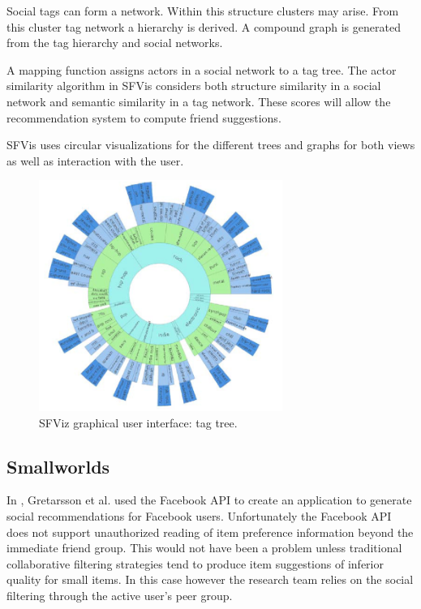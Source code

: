 Social tags can form a network. Within this structure clusters may arise. From this cluster tag network a hierarchy is derived. A compound graph is generated from the tag hierarchy and social networks.

A mapping function assigns actors in a social network to a tag tree. The actor similarity algorithm in SFVis considers both structure similarity in a social network and semantic similarity in a tag network. These scores will allow the recommendation system to compute friend suggestions.

SFVis uses circular visualizations for the different trees and graphs for both views as well as interaction with the user.

\begin{figure}%
	\begin{center}
		\includegraphics[width=300px]{img/sfviz_tagtree}%
	\end{center}
	\caption{SFViz graphical user interface: tag tree.}%
	\label{figure:sfviz}%
\end{figure}



\subsection{Smallworlds}\label{chapter:survey:section:applications:subsection:smallwords}

In \cite{gretarsson:2010}, Gretarsson et al. used the Facebook API to create an application to generate social recommendations for Facebook users. Unfortunately the Facebook API does not support unauthorized reading of item preference information beyond the immediate friend group. This would not have been a problem unless traditional collaborative filtering strategies tend to produce item suggestions of inferior quality for small items. In this case however the research team relies on the social filtering through the active user's peer group\cite{gretarsson:2010}.

